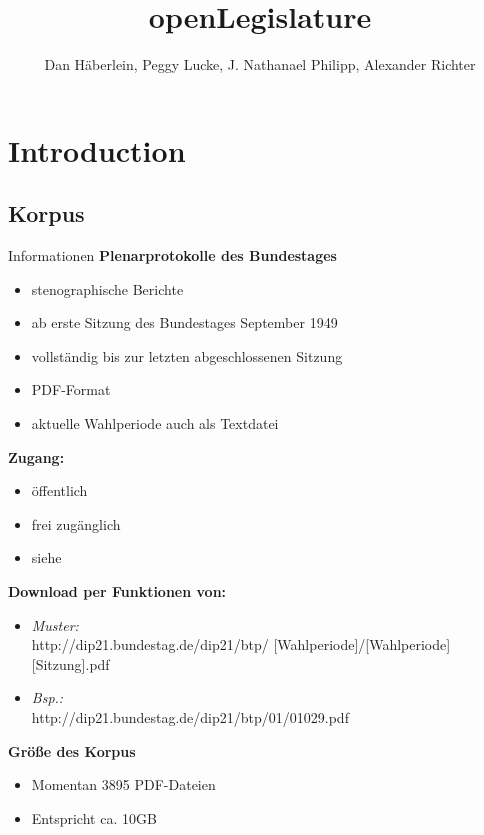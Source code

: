 \documentclass[11pt, a4paper]{beamer}
\author{Dan Häberlein, Peggy Lucke, J. Nathanael Philipp, Alexander Richter}
\title{openLegislature}
\date{}
\institute{Universität Leipzig}
\begin{document}
\section{}
\begin{frame}
\titlepage
\end{frame}

 {
}


\section{Introduction}
\subsection{Korpus}
\begin{frame}{Informationen}
\textbf{Plenarprotokolle des Bundestages}
\begin{itemize}
\item stenographische Berichte
\item ab erste Sitzung des Bundestages September 1949
\item vollständig bis zur letzten abgeschlossenen Sitzung
\item PDF-Format
\item aktuelle Wahlperiode auch als Textdatei
\end{itemize}
\end{frame}

\begin{frame}
\textbf{Zugang:}
\begin{itemize}
\item öffentlich
\item frei zugänglich
\item siehe \cite{bundestag} \\[1em]
\end{itemize}
\textbf{Download per Funktionen von:}
\begin{itemize}
\item \textit{Muster:}\\
http://dip21.bundestag.de/dip21/btp/ [Wahlperiode]/[Wahlperiode][Sitzung].pdf
\item \textit{Bsp.:}\\ http://dip21.bundestag.de/dip21/btp/01/01029.pdf\\[1em]
\end{itemize}
\textbf{Größe des Korpus}
\begin{itemize}
\item Momentan 3895 PDF-Dateien
\item Entspricht ca. 10GB
\end{itemize}
\end{frame}
\end{document}
